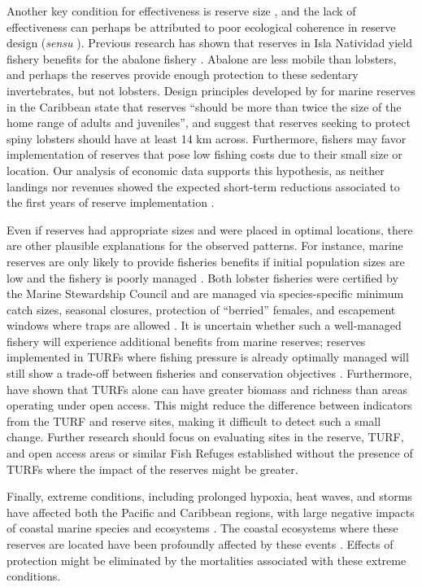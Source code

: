 \documentclass{frontiersSCNS}
\begin{document}
Another key condition for effectiveness is reserve size
\citep{edgar_2014-UO}, and the lack of effectiveness can perhaps be
attributed to poor ecological coherence in reserve design (\emph{sensu}
\citet{rees_2018}). Previous research has shown that reserves in Isla
Natividad yield fishery benefits for the abalone fishery
\citep{rossetto_2015-V0}. Abalone are less mobile than lobsters, and
perhaps the reserves provide enough protection to these sedentary
invertebrates, but not lobsters. Design principles developed by
\citet{green_2017} for marine reserves in the Caribbean state that
reserves ``should be more than twice the size of the home range of
adults and juveniles'', and suggest that reserves seeking to protect
spiny lobsters should have at least 14 km across. Furthermore, fishers
may favor implementation of reserves that pose low fishing costs due to
their small size or location. Our analysis of economic data supports
this hypothesis, as neither landings nor revenues showed the expected
short-term reductions associated to the first years of reserve
implementation \citep{ovando_2016-Wg}.

Even if reserves had appropriate sizes and were placed in optimal
locations, there are other plausible explanations for the observed
patterns. For instance, marine reserves are only likely to provide
fisheries benefits if initial population sizes are low and the fishery
is poorly managed \citep{hilborn_2004,hilborn_2006}. Both lobster
fisheries were certified by the Marine Stewardship Council and are
managed via species-specific minimum catch sizes, seasonal closures,
protection of ``berried'' females, and escapement windows where traps
are allowed \citep{dof_website_1993}. It is uncertain whether such a
well-managed fishery will experience additional benefits from marine
reserves; reserves implemented in TURFs where fishing pressure is
already optimally managed will still show a trade-off between fisheries
and conservation objectives \citep{lester_2017}. Furthermore,
\citet{gelcich_2008} have shown that TURFs alone can have greater
biomass and richness than areas operating under open access. This might
reduce the difference between indicators from the TURF and reserve
sites, making it difficult to detect such a small change. Further
research should focus on evaluating sites in the reserve, TURF, and open
access areas or similar Fish Refuges established without the presence of
TURFs where the impact of the reserves might be greater.

Finally, extreme conditions, including prolonged hypoxia, heat waves,
and storms have affected both the Pacific and Caribbean regions, with
large negative impacts of coastal marine species and ecosystems
\citep{cavole_2016,hughes_2018,breitburg_2018}. The coastal ecosystems
where these reserves are located have been profoundly affected by these
events \citep{micheli_2012-EU,woodson_2018}. Effects of protection might
be eliminated by the mortalities associated with these extreme
conditions.
\end{document}
